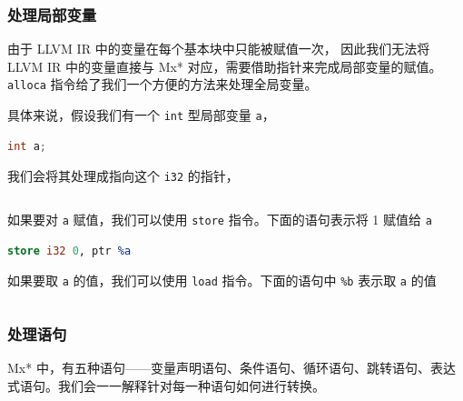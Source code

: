 \subsubsection{处理局部变量}\label{AST-to-IR-local-variables}

由于 LLVM IR 中的变量在每个基本块中只能被赋值一次，
因此我们无法将 LLVM IR 中的变量直接与 Mx* 对应，需要借助指针来完成局部变量的赋值。
\texttt{alloca} 指令给了我们一个方便的方法来处理全局变量。

具体来说，假设我们有一个 \texttt{int} 型局部变量 \texttt{a}，
\begin{lstlisting}[language=C++]
int a;
\end{lstlisting}
我们会将其处理成指向这个 \texttt{i32} 的指针，
\begin{lstlisting}[language=LLVM]
%a = alloca i32
\end{lstlisting}
如果要对 \texttt{a} 赋值，我们可以使用 \texttt{store} 指令。下面的语句表示将 1 赋值给 \texttt{a}
\begin{lstlisting}[language=LLVM]
store i32 0, ptr %a
\end{lstlisting}
如果要取 \texttt{a} 的值，我们可以使用 \texttt{load} 指令。下面的语句中 \texttt{\%b}
表示取 \texttt{a} 的值
\begin{lstlisting}[language=LLVM]
%b = load i32, ptr %5
\end{lstlisting}

\subsubsection{处理语句}\label{AST-to-IR-statements}

Mx* 中，有五种语句——变量声明语句、条件语句、循环语句、跳转语句、表达式语句。我们会一一解释针对每一种语句如何进行转换。

